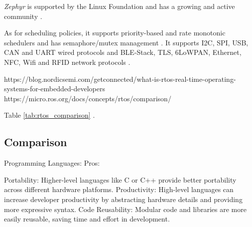 \textit{Zephyr} is supported by the Linux Foundation and has a growing and active community \cite{zephyr}.

As for scheduling policies, it supports priority-based and rate monotonic schedulers and has semaphore/mutex management \cite{compRTOS}.
It supports \gls{I2C}, \gls{SPI}, \gls{USB}, \gls{CAN} and \gls{UART} wired protocols and \gls{BLE}-Stack, \gls{TLS}, 6LoWPAN, Ethernet, \gls{NFC}, \gls{Wifi} and \gls{RFID} network protocols \cite{compRTOS} \cite{compRTOS}.


https://blog.nordicsemi.com/getconnected/what-is-rtos-real-time-operating-systems-for-embedded-developers
https://micro.ros.org/docs/concepts/rtos/comparison/


Table \ref{tab:rtos_comparison} \cite{compRTOS}.
\begin{table}[H]
    \centering
    \caption{Comparison of Real-Time Operating Systems}
    \label{tab:rtos_comparison}
\end{table}


\subsection{Comparison}
Programming Languages:
Pros:

Portability: Higher-level languages like C or C++ provide better portability across different hardware platforms.
Productivity: High-level languages can increase developer productivity by abstracting hardware details and providing more expressive syntax.
Code Reusability: Modular code and libraries are more easily reusable, saving time and effort in development.

